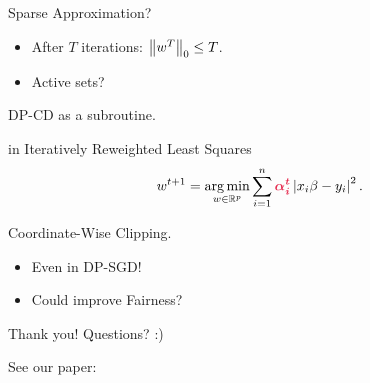 \documentclass{beamer}
\begin{document}
\begin{frame}

  \vspace{1.5em}
  {\Huge\centering
    Sparse Approximation?
  }
  \begin{itemize}
  \item After $T$ iterations: $\left \lVert w^T \right \rVert_0 \le T$.
  \item Active sets?
  \end{itemize}

  \vspace{-1em}

\end{frame}

\begin{frame}
  \vspace{1.5em}
  {\Huge\centering
    DP-CD as a subroutine.
  }

  \eg in Iteratively Reweighted Least Squares
  \begin{align*}
    w^{t+1} = \argmin_{w\in\RR^p} \sum_{i=1}^n \emphcol{\alpha_i^t} \abs{x_i\beta - y_i}^2.
  \end{align*}

\end{frame}

\begin{frame}

  \vspace{1.5em}
  {\Huge\centering
    Coordinate-Wise Clipping.
  }
  \begin{itemize}
  \item Even in DP-SGD!
  \item Could improve Fairness?
  \end{itemize}

\end{frame}



\begin{frame}

  \vspace{4em}
  {\Huge
    \begin{center}
      Thank you! Questions? :)
    \end{center}
  }

  \vspace{3em}

  See our paper:

  \vspace{-1em}


\end{frame}
\end{document}
